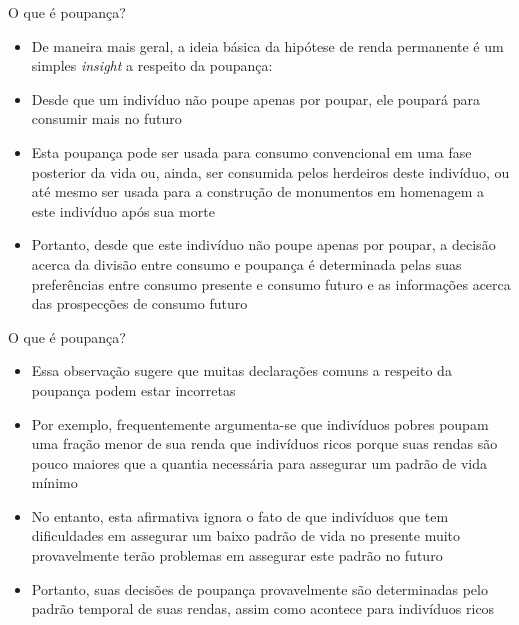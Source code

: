 \documentclass[10pt]{beamer}
\begin{document}
\begin{frame}{O que é poupança?}
    \begin{itemize}
        \item De maneira mais geral, a ideia básica da hipótese de renda permanente é um simples \emph{insight} a respeito da poupança: 
        \bigskip
        \item Desde que um indivíduo não poupe apenas por poupar, ele poupará para consumir mais no futuro
        \bigskip
        \item Esta poupança pode ser usada para consumo convencional em uma fase posterior da vida ou, ainda, ser consumida pelos herdeiros deste indivíduo, ou até mesmo ser usada para a construção de monumentos em homenagem a este indivíduo após sua morte
        \bigskip
        \item Portanto, desde que este indivíduo não poupe apenas por poupar, a decisão acerca da divisão entre consumo e poupança é determinada pelas suas preferências entre consumo presente e consumo futuro e as informações acerca das prospecções de consumo futuro
    \end{itemize}
\end{frame}

\begin{frame}{O que é poupança?}
    \begin{itemize}
        \item Essa observação sugere que muitas declarações comuns a respeito da poupança podem estar incorretas
        \bigskip
        \item Por exemplo, frequentemente argumenta-se que indivíduos pobres poupam uma fração menor de sua renda que indivíduos ricos porque suas rendas são pouco maiores que a quantia necessária para assegurar um padrão de vida mínimo
        \bigskip
        \item No entanto, esta afirmativa ignora o fato de que indivíduos que tem dificuldades em assegurar um baixo padrão de vida no presente muito provavelmente terão problemas em assegurar este padrão no futuro
        \bigskip
        \item Portanto, suas decisões de poupança provavelmente são determinadas pelo padrão temporal de suas rendas, assim como acontece para indivíduos ricos
    \end{itemize}
\end{frame}
\end{document}
